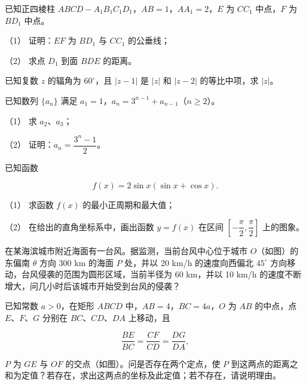 \Needspace{0.4\textheight}
\begin{question}
已知正四棱柱 $ABCD-A_1B_1C_1D_1$，$AB=1$，$AA_1=2$，$E$ 为 $CC_1$ 中点，$F$ 为 $BD_1$ 中点。
\nopagebreak[4]
\begin{center}\end{center}
\nopagebreak[4]
（1） 证明：$EF$ 为 $BD_1$ 与 $CC_1$ 的公垂线；

（2） 求点 $D_1$ 到面 $BDE$ 的距离。

\end{question}
\begin{question}
已知复数 $z$ 的辐角为 $60^\circ$，且 $|z-1|$ 是 $|z|$ 和 $|z-2|$ 的等比中项，求 $|z|$。

\end{question}
\begin{question}
已知数列 $\{a_n\}$ 满足 $a_1=1$，$a_n=3^{n-1}+a_{n-1}$（$n\geqslant2$）。

（1） 求 $a_2\text{、}a_3$；

（2） 证明：$a_n=\dfrac{3^n-1}{2}$。

\Needspace{0.4\textheight}
\end{question}
\begin{question}
已知函数

\nopagebreak[4]
\[
f(x)=2\sin x(\sin x+\cos x).
\]

（1） 求函数 $f(x)$ 的最小正周期和最大值；

（2） 在给出的直角坐标系中，画出函数 $y=f(x)$ 在区间 $\left[-\dfrac\pi2,\dfrac\pi2\right]$ 上的图象。
\nopagebreak[4]
\begin{center}\end{center}
\nopagebreak[4]
\Needspace{0.4\textheight}
\end{question}
\begin{question}
在某海滨城市附近海面有一台风。据监测，当前台风中心位于城市 $O$（如图）的东偏南 $\theta$ 方向 300 km 的海面 $P$ 处，并以 20 km/h 的速度向西偏北 $45^\circ$ 方向移动，台风侵袭的范围为圆形区域，当前半径为 60 km，并以 10 km/h 的速度不断增大，问几小时后该城市开始受到台风的侵袭？
\nopagebreak[4]
\begin{center}\end{center}
\nopagebreak[4]
\Needspace{0.4\textheight}
\end{question}
\begin{question}
已知常数 $a>0$，在矩形 $ABCD$ 中，$AB=4$，$BC=4a$，$O$ 为 $AB$ 的中点，点 $E\text{、}F\text{、}G$ 分别在 $BC\text{、}CD\text{、}DA$ 上移动，且

\nopagebreak[4]
\[
\frac{BE}{BC}=\frac{CF}{CD}=\frac{DG}{DA},
\]

$P$ 为 $GE$ 与 $OF$ 的交点（如图）。问是否存在两个定点，使 $P$ 到这两点的距离之和为定值？若存在，求出这两点的坐标及此定值；若不存在，请说明理由。
\nopagebreak[4]
\begin{center}\end{center}
\nopagebreak[4]

\end{question}